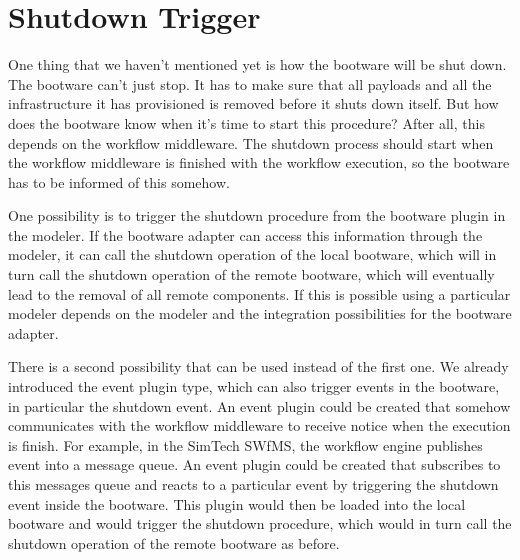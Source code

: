 \section{Shutdown Trigger}
\label{design:shutdown}

One thing that we haven't mentioned yet is how the bootware will be shut down.
The bootware can't just stop.
It has to make sure that all payloads and all the infrastructure it has provisioned is removed before it shuts down itself.
But how does the bootware know when it's time to start this procedure?
After all, this depends on the workflow middleware.
The shutdown process should start when the workflow middleware is finished with the workflow execution, so the bootware has to be informed of this somehow.

One possibility is to trigger the shutdown procedure from the bootware plugin in the modeler.
If the bootware adapter can access this information through the modeler, it can call the shutdown operation of the local bootware, which will in turn call the shutdown operation of the remote bootware, which will eventually lead to the removal of all remote components.
If this is possible using a particular modeler depends on the modeler and the integration possibilities for the bootware adapter.

There is a second possibility that can be used instead of the first one.
We already introduced the event plugin type, which can also trigger events in the bootware, in particular the shutdown event.
An event plugin could be created that somehow communicates with the workflow middleware to receive notice when the execution is finish.
For example, in the SimTech SWfMS, the workflow engine publishes event into a message queue.
An event plugin could be created that subscribes to this messages queue and reacts to a particular event by triggering the shutdown event inside the bootware.
This plugin would then be loaded into the local bootware and would trigger the shutdown procedure, which would in turn call the shutdown operation of the remote bootware as before.
